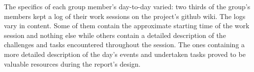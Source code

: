 The specifics of each group member's day-to-day varied: two thirds of the group's members kept a log of their work sessions on the project's github wiki. 
The logs vary in content. Some of them contain the approximate starting time of the work session and nothing else while others contain a detailed description of the challenges and tasks encountered throughout the session.
The ones containing a more detailed description of the day's events and undertaken tasks proved to be valuable resources during the report's design.



